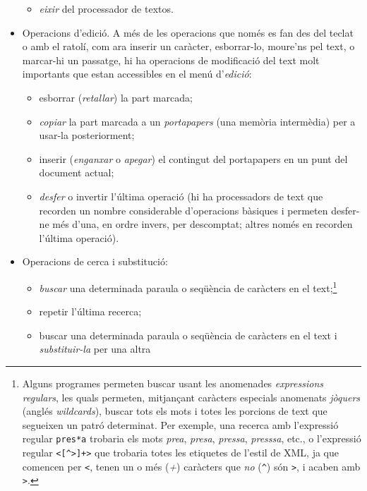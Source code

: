 \begin{itemize}
\begin{itemize}
     \item \emph{eixir} del processador de textos.
     \end{itemize}
\item Operacions d'edició. A més de les operacions que només es
  fan des del teclat o amb el ratolí, com ara inserir un caràcter, esborrar-lo,
  moure'ns pel text, o marcar-hi un passatge, hi ha operacions de
  modificació del text molt importants que estan accessibles en el
  menú d'\emph{edició}:
     \begin{itemize}
     \item esborrar (\emph{retallar}) la part marcada;
     \item \emph{copiar} la part marcada a un \emph{portapapers} (una
       memòria intermèdia) per a usar-la posteriorment;
     \item inserir (\emph{enganxar} o \emph{apegar}) 
          el contingut del portapapers
           en un punt del document actual;
     \item \emph{desfer} o invertir l'última operació
       (hi ha processadors de text que recorden un nombre considerable
       d'operacions bàsiques i permeten desfer-ne més d'una, en ordre
       invers, per descomptat; altres només en recorden l'última operació).
     \end{itemize}
\item Operacions de cerca i substitució:
     \begin{itemize}
     \item \emph{buscar} una determinada paraula o seqüència de
       caràcters en el text;\footnote{Alguns programes permeten buscar
         usant les anomenades \emph{expressions regulars}, les quals
         permeten, mitjançant caràcters especials anomenats
         \emph{jòquers} (anglés \emph{wildcards}), buscar tots els
         mots i totes les porcions de text que segueixen un patró
         determinat. Per exemple, una recerca amb l'expressió regular
         \texttt{pres*a} trobaria els mots \emph{prea}, \emph{presa},
         \emph{pressa}, \emph{presssa}, etc., o l'expressió regular 
\texttt{<[\^{}>]+>} 
         que trobaria totes les etiquetes de l'estil de XML, ja que
         comencen per \texttt{<}, tenen un o més (\emph{+}) caràcters
         que \emph{no} (\texttt{\^}) són \texttt{>}, i acaben amb
         \texttt{>}.}
     \item repetir l'última recerca;
     \item buscar una determinada paraula o seqüència de
           caràcters en el text i \emph{substituir-la} per una altra

\end{itemize}
\end{itemize}
